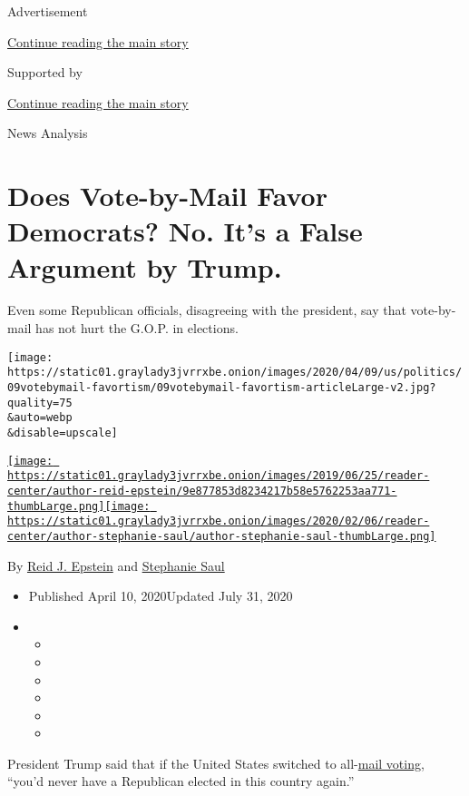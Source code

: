 Advertisement

\protect\hyperlink{after-top}{Continue reading the main story}

Supported by

\protect\hyperlink{after-sponsor}{Continue reading the main story}

News Analysis

\hypertarget{does-vote-by-mail-favor-democrats-no-its-a-false-argument-by-trump}{%
\section{Does Vote-by-Mail Favor Democrats? No. It's a False Argument by
Trump.}\label{does-vote-by-mail-favor-democrats-no-its-a-false-argument-by-trump}}

Even some Republican officials, disagreeing with the president, say that
vote-by-mail has not hurt the G.O.P. in elections.

\texttt{[image: https://static01.graylady3jvrrxbe.onion/images/2020/04/09/us/politics/09votebymail-favortism/09votebymail-favortism-articleLarge-v2.jpg?quality=75\\\&auto=webp\\\&disable=upscale]}

\href{https://www.nytimes3xbfgragh.onion/by/reid-j-epstein}{\texttt{[image: https://static01.graylady3jvrrxbe.onion/images/2019/06/25/reader-center/author-reid-epstein/9e877853d8234217b58e5762253aa771-thumbLarge.png]}}\href{https://www.nytimes3xbfgragh.onion/by/stephanie-saul}{\texttt{[image: https://static01.graylady3jvrrxbe.onion/images/2020/02/06/reader-center/author-stephanie-saul/author-stephanie-saul-thumbLarge.png]}}

By \href{https://www.nytimes3xbfgragh.onion/by/reid-j-epstein}{Reid J.
Epstein} and
\href{https://www.nytimes3xbfgragh.onion/by/stephanie-saul}{Stephanie
Saul}

\begin{itemize}
\item
  Published April 10, 2020Updated July 31, 2020
\item
  \begin{itemize}
  \item
  \item
  \item
  \item
  \item
  \item
  \end{itemize}
\end{itemize}

President Trump said that if the United States switched to
all-\href{https://www.nytimes3xbfgragh.onion/2020/07/31/us/politics/trump-mail-voting-fraud.html}{mail
voting}, ``you'd never have a Republican elected in this country
again.''

